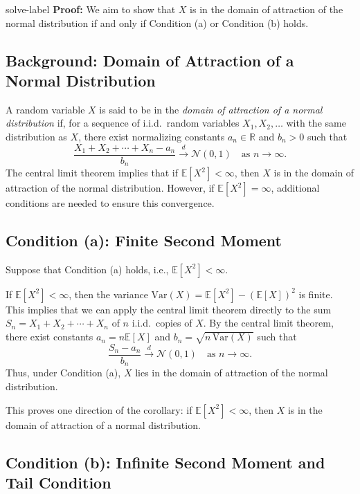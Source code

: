 	\begin{solve}{}{solve-label}
\textbf{Proof:}
We aim to show that \( X \) is in the domain of attraction of the normal distribution if and only if Condition (a) or Condition (b) holds.

\subsection*{Background: Domain of Attraction of a Normal Distribution}

A random variable \( X \) is said to be in the \textit{domain of attraction of a normal distribution} if, for a sequence of i.i.d.\ random variables \( X_1, X_2, \ldots \) with the same distribution as \( X \), there exist normalizing constants \( a_n \in \mathbb{R} \) and \( b_n > 0 \) such that
\[
\frac{X_1 + X_2 + \cdots + X_n - a_n}{b_n} \xrightarrow{d} \mathcal{N}(0, 1) \quad \text{as } n \to \infty.
\]
The central limit theorem implies that if \( \mathbb{E}[X^2] < \infty \), then \( X \) is in the domain of attraction of the normal distribution. However, if \( \mathbb{E}[X^2] = \infty \), additional conditions are needed to ensure this convergence.

\subsection*{Condition (a): Finite Second Moment}

Suppose that Condition (a) holds, i.e., \( \mathbb{E}[X^2] < \infty \).

If \( \mathbb{E}[X^2] < \infty \), then the variance \( \mathrm{Var}(X) = \mathbb{E}[X^2] - (\mathbb{E}[X])^2 \) is finite. This implies that we can apply the central limit theorem directly to the sum \( S_n = X_1 + X_2 + \cdots + X_n \) of \( n \) i.i.d.\ copies of \( X \). By the central limit theorem, there exist constants \( a_n = n \mathbb{E}[X] \) and \( b_n = \sqrt{n \, \mathrm{Var}(X)} \) such that
\[
\frac{S_n - a_n}{b_n} \xrightarrow{d} \mathcal{N}(0, 1) \quad \text{as } n \to \infty.
\]
Thus, under Condition (a), \( X \) lies in the domain of attraction of the normal distribution.

This proves one direction of the corollary: if \( \mathbb{E}[X^2] < \infty \), then \( X \) is in the domain of attraction of a normal distribution.

\subsection*{Condition (b): Infinite Second Moment and Tail Condition}


\end{solve}
